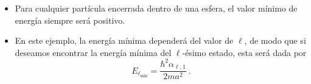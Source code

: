 \begin{ejemplo}
\begin{itemize}
        \item Para cualquier partícula encerrada dentro de una esfera, el valor mínimo de energía siempre será positivo.

        \item En este ejemplo, la energía mínima dependerá del valor de $\ell$, de modo que si deseamos encontrar la energía mínima del $\ell$-ésimo estado, esta será dada por
        \begin{equation*}
            E_{\ell_{\min}} = \frac{\hbar^2 \alpha_{\ell, 1}}{2ma^2} \ .
        \end{equation*}
    \end{itemize}
\end{ejemplo}